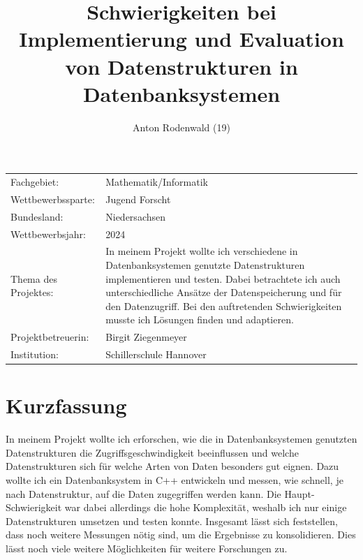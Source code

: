 \documentclass[11pt,a4paper]{article}
\begin{document}
\title{Schwierigkeiten bei Implementierung und Evaluation von Datenstrukturen in Datenbanksystemen}
\author{Anton Rodenwald (19)}
\maketitle

\addtocounter{page}{-3}
\thispagestyle{empty}

\large
\begin{tabular}{l p{12cm}}

    Fachgebiet:          & Mathematik/Informatik   \\

    Wettbewerbssparte:   & Jugend Forscht          \\

    Bundesland:          & Niedersachsen           \\

    Wettbewerbsjahr:     & 2024                    \\

    Thema des Projektes: &
    In meinem Projekt wollte ich verschiedene in Datenbanksystemen genutzte Datenstrukturen
    implementieren und testen. Dabei betrachtete ich auch unterschiedliche Ansätze der
    Datenspeicherung und für den Datenzugriff. Bei den auftretenden Schwierigkeiten
    musste ich Lösungen finden und adaptieren.     \\

    Projektbetreuerin:   & Birgit Ziegenmeyer      \\

    Institution:         & Schillerschule Hannover \\
\end{tabular}

\clearpage

\pagestyle{empty}


\section*{Kurzfassung}

In meinem Projekt wollte ich erforschen, wie die in Datenbanksystemen genutzten
Datenstrukturen die Zugriffsgeschwindigkeit beeinflussen und welche Datenstrukturen
sich für welche Arten von Daten besonders gut eignen.
Dazu wollte ich ein Datenbanksystem in C++ entwickeln und messen, wie
schnell, je nach Datenstruktur, auf die Daten zugegriffen werden kann.
Die Haupt-Schwierigkeit war dabei allerdings die hohe Komplexität,
weshalb ich nur einige Datenstrukturen umsetzen und testen konnte.
Insgesamt lässt sich feststellen, dass noch weitere Messungen nötig
sind, um die Ergebnisse zu konsolidieren.
Dies lässt noch viele weitere Möglichkeiten für weitere Forschungen zu.
\end{document}
